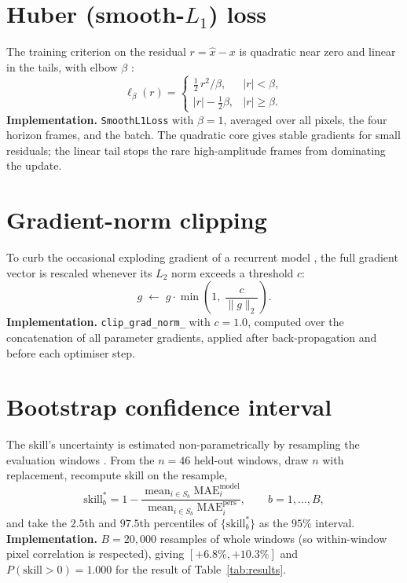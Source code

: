 \section{Huber (smooth-$L_1$) loss}
The training criterion on the residual $r=\hat{x}-x$ is quadratic near zero and
linear in the tails, with elbow $\beta$ \citep{huber1964}:
\begin{equation}
  \ell_\beta(r)=
  \begin{cases}
    \tfrac{1}{2}\,r^2/\beta, & |r|<\beta,\\[2pt]
    |r|-\tfrac{1}{2}\beta, & |r|\ge\beta.
  \end{cases}
\end{equation}
\textbf{Implementation.} \texttt{SmoothL1Loss} with $\beta=1$, averaged over all
pixels, the four horizon frames, and the batch. The quadratic core gives stable
gradients for small residuals; the linear tail stops the rare high-amplitude
frames from dominating the update.

\section{Gradient-norm clipping}
To curb the occasional exploding gradient of a recurrent model \citep{pascanu2013},
the full gradient vector is rescaled whenever its $L_2$ norm exceeds a threshold $c$:
\begin{equation}
  g \;\leftarrow\; g\cdot\min\!\left(1,\ \frac{c}{\lVert g\rVert_2}\right).
\end{equation}
\textbf{Implementation.} \texttt{clip\_grad\_norm\_} with $c=1.0$, computed over the
concatenation of all parameter gradients, applied after back-propagation and before
each optimiser step.

\section{Bootstrap confidence interval}
The skill's uncertainty is estimated non-parametrically by resampling the
evaluation windows \citep{efron1979}. From the $n=46$ held-out windows, draw $n$
with replacement, recompute skill on the resample,
\begin{equation}
  \text{skill}^\ast_b = 1 - \frac{\operatorname{mean}_{i\in S_b}\mathrm{MAE}^{\text{model}}_i}
                             {\operatorname{mean}_{i\in S_b}\mathrm{MAE}^{\text{pers}}_i},
  \qquad b=1,\dots,B,
\end{equation}
and take the $2.5$th and $97.5$th percentiles of $\{\text{skill}^\ast_b\}$ as the
$95\%$ interval.
\textbf{Implementation.} $B=20{,}000$ resamples of whole windows (so within-window
pixel correlation is respected), giving $[+6.8\%,+10.3\%]$ and
$P(\text{skill}>0)=1.000$ for the result of Table~\ref{tab:results}.
